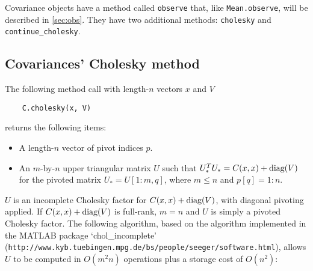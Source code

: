 \documentclass{report}
\begin{document}
Covariance objects have a method called \texttt{observe} that, like \texttt{Mean.observe}, will be described in \ref{sec:obs}. They have two additional methods: \texttt{cholesky} and \texttt{continue\_cholesky}.

\subsection{Covariances' Cholesky method}
The following method call with length-$n$ vectors $x$ and $V$
\begin{verbatim}
    C.cholesky(x, V)
\end{verbatim}
returns the following items:
\begin{itemize}
    \item A length-$n$ vector of pivot indices $p$.
    \item An $m$-by-$n$ upper triangular matrix $U$ such that $U_*^TU_* = C(x,x) + \textup{diag}(V)$ for the pivoted matrix $U_* = U[1:m,q]$, where $m\le n$ and $p[q]=1:n$.
\end{itemize}
$U$ is an incomplete Cholesky factor \cite{incompchol} for $C(x,x)+\textup{diag}(V)$, with diagonal pivoting applied. If $C(x,x)+\textup{diag}(V)$ is full-rank, $m=n$ and $U$ is simply a pivoted Cholesky factor. The following algorithm, based on the algorithm implemented in the MATLAB package `chol\_incomplete' \linebreak
(\texttt{http://www.kyb.tuebingen.mpg.de/bs/people/seeger/software.html}), allows $U$ to be computed in $O(m^2n)$ operations plus a storage cost of $O(n^2)$:
\end{document}
